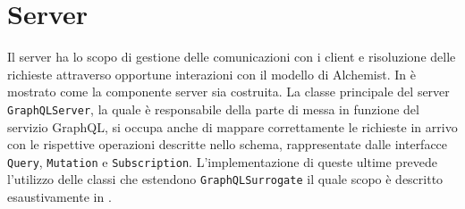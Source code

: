 \section{Server}\label{sec:server}
Il server ha lo scopo di gestione delle comunicazioni con i client e risoluzione delle richieste attraverso opportune interazioni con il modello
di Alchemist.
In  è mostrato come la componente server sia costruita. La classe principale del server \texttt{GraphQLServer}, la quale è responsabile della parte
di messa in funzione del servizio GraphQL, si occupa anche di mappare correttamente le richieste in arrivo con le rispettive operazioni 
descritte nello schema, rappresentate dalle interfacce \texttt{Query}, \texttt{Mutation} e \texttt{Subscription}. L'implementazione di queste ultime
prevede l'utilizzo delle classi che estendono \texttt{GraphQLSurrogate} il quale scopo è descritto esaustivamente in .
%
%

